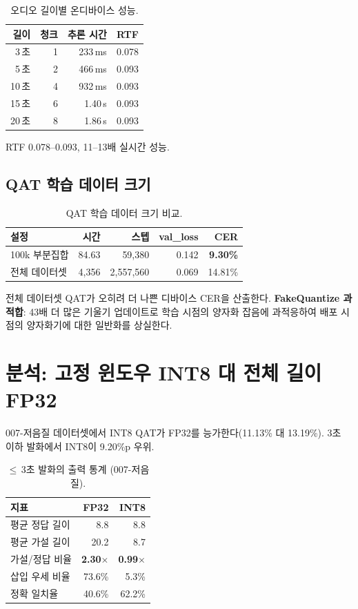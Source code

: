 \documentclass[a4paper,11pt,twocolumn]{article}
\begin{document}
\begin{table}[t]
\centering
\caption{오디오 길이별 온디바이스 성능.}
\small
\begin{tabular}{@{}rrrr@{}}
\toprule
길이 & 청크 & 추론 시간 & RTF \\
\midrule
3\,초 & 1 & 233\,ms & 0.078 \\
5\,초 & 2 & 466\,ms & 0.093 \\
10\,초 & 4 & 932\,ms & 0.093 \\
15\,초 & 6 & 1.40\,s & 0.093 \\
20\,초 & 8 & 1.86\,s & 0.093 \\
\bottomrule
\end{tabular}
\end{table}

RTF 0.078--0.093, 11--13배 실시간 성능.

\subsection{QAT 학습 데이터 크기}

\begin{table}[t]
\centering
\caption{QAT 학습 데이터 크기 비교.}
\small
\begin{tabular}{@{}lrrrr@{}}
\toprule
설정 & 시간 & 스텝 & val\_loss & CER \\
\midrule
100k 부분집합 & 84.63 & 59,380 & 0.142 & \textbf{9.30\%} \\
전체 데이터셋 & 4,356 & 2,557,560 & 0.069 & 14.81\% \\
\bottomrule
\end{tabular}
\end{table}

전체 데이터셋 QAT가 오히려 더 나쁜 디바이스 CER을 산출한다. \textbf{FakeQuantize 과적합}: 43배 더 많은 기울기 업데이트로 학습 시점의 양자화 잡음에 과적응하여 배포 시점의 양자화기에 대한 일반화를 상실한다.

\section{분석: 고정 윈도우 INT8 대 전체 길이 FP32}
\label{sec:analysis}

007-저음질 데이터셋에서 INT8 QAT가 FP32를 능가한다(11.13\% 대 13.19\%). 3초 이하 발화에서 INT8이 9.20\%p 우위.

\begin{table}[t]
\centering
\caption{$\leq$\,3초 발화의 출력 통계 (007-저음질).}
\small
\begin{tabular}{@{}lrr@{}}
\toprule
지표 & FP32 & INT8 \\
\midrule
평균 정답 길이 & 8.8 & 8.8 \\
평균 가설 길이 & 20.2 & 8.7 \\
가설/정답 비율 & \textbf{2.30$\times$} & \textbf{0.99$\times$} \\
삽입 우세 비율 & 73.6\% & 5.3\% \\
정확 일치율 & 40.6\% & 62.2\% \\
\bottomrule
\end{tabular}
\end{table}
\end{document}
